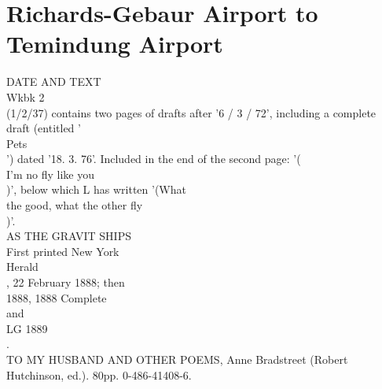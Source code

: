 \documentclass[smalldemyvopaper,11pt,twoside,onecolumn,openright,extrafontsizes]{memoir}
\begin{document}
\chapter{Richards-Gebaur Airport to Temindung Airport}
DATE AND TEXT
\\Wkbk 2
\\(1/2/37) contains two pages of drafts after '6 / 3 / 72', including a complete draft (entitled '
\\Pets
\\') dated '18. 3. 76'. Included in the end of the second page: '(
\\I'm no fly like you
\\)', below which L has written '(What
\\the good, what the other fly
\\)'.
\\AS THE GRAVIT SHIPS
\\First printed New York
\\Herald
\\, 22 February 1888; then
\\1888, 1888 Complete
\\and
\\LG 1889
\\.
\\TO MY HUSBAND AND OTHER POEMS, Anne Bradstreet (Robert Hutchinson, ed.). 80pp. 0-486-41408-6.
\end{document}
